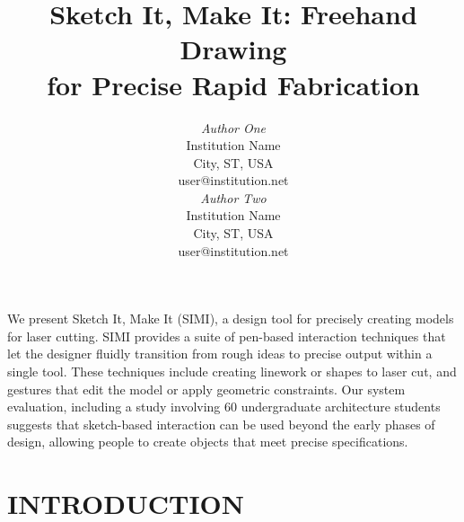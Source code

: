 \documentclass{article}
\begin{document}

\toappear{}



\title{Sketch It, Make It: Freehand Drawing\\
for Precise Rapid Fabrication}

\author{
\parbox[t]{9cm}{\centering
	     {\em Author One}\\
	     Institution Name\\
             City, ST, USA\\
	     user@institution.net}
\parbox[t]{9cm}{\centering
	     {\em Author Two}\\
	     Institution Name\\
             City, ST, USA\\
	     user@institution.net}
}

\maketitle

\abstract We present Sketch It, Make It (SIMI), a design tool for
precisely creating models for laser cutting. SIMI provides a suite of
pen-based interaction techniques that let the designer fluidly
transition from rough ideas to precise output within a single
tool. These techniques include creating linework or shapes to laser
cut, and gestures that edit the model or apply geometric
constraints. Our system evaluation, including a study involving 60
undergraduate architecture students suggests that sketch-based
interaction can be used beyond the early phases of design, allowing
people to create objects that meet precise specifications.





\section{INTRODUCTION}
\end{document}
